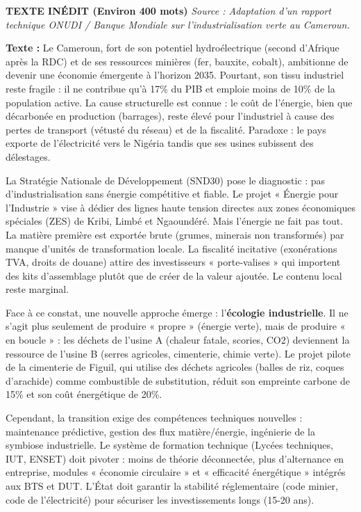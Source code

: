 \documentclass[11pt]{article}
\begin{document}
\begin{exoresolu}
\textbf{TEXTE INÉDIT (Environ 400 mots)}
\textit{Source : Adaptation d'un rapport technique ONUDI / Banque Mondiale sur l'industrialisation verte au Cameroun.}

\textbf{Texte :}
Le Cameroun, fort de son potentiel hydroélectrique (second d'Afrique après la RDC) et de ses ressources minières (fer, bauxite, cobalt), ambitionne de devenir une économie émergente à l'horizon 2035. Pourtant, son tissu industriel reste fragile : il ne contribue qu'à 17\% du PIB et emploie moins de 10\% de la population active. La cause structurelle est connue : le coût de l'énergie, bien que décarbonée en production (barrages), reste élevé pour l'industriel à cause des pertes de transport (vétusté du réseau) et de la fiscalité. Paradoxe : le pays exporte de l'électricité vers le Nigéria tandis que ses usines subissent des délestages.

La Stratégie Nationale de Développement (SND30) pose le diagnostic : pas d'industrialisation sans énergie compétitive et fiable. Le projet « Énergie pour l'Industrie » vise à dédier des lignes haute tension directes aux zones économiques spéciales (ZES) de Kribi, Limbé et Ngaoundéré. Mais l'énergie ne fait pas tout. La matière première est exportée brute (grumes, minerais non transformés) par manque d'unités de transformation locale. La fiscalité incitative (exonérations TVA, droits de douane) attire des investisseurs « porte-valises » qui importent des kits d'assemblage plutôt que de créer de la valeur ajoutée. Le contenu local reste marginal.

Face à ce constat, une nouvelle approche émerge : l'\textbf{écologie industrielle}. Il ne s'agit plus seulement de produire « propre » (énergie verte), mais de produire « en boucle » : les déchets de l'usine A (chaleur fatale, scories, CO2) deviennent la ressource de l'usine B (serres agricoles, cimenterie, chimie verte). Le projet pilote de la cimenterie de Figuil, qui utilise des déchets agricoles (balles de riz, coques d'arachide) comme combustible de substitution, réduit son empreinte carbone de 15\% et son coût énergétique de 20\%.

Cependant, la transition exige des compétences techniques nouvelles : maintenance prédictive, gestion des flux matière/énergie, ingénierie de la symbiose industrielle. Le système de formation technique (Lycées techniques, IUT, ENSET) doit pivoter : moins de théorie déconnectée, plus d'alternance en entreprise, modules « économie circulaire » et « efficacité énergétique » intégrés aux BTS et DUT. L'État doit garantir la stabilité réglementaire (code minier, code de l'électricité) pour sécuriser les investissements longs (15-20 ans).


\end{exoresolu}
\end{document}
